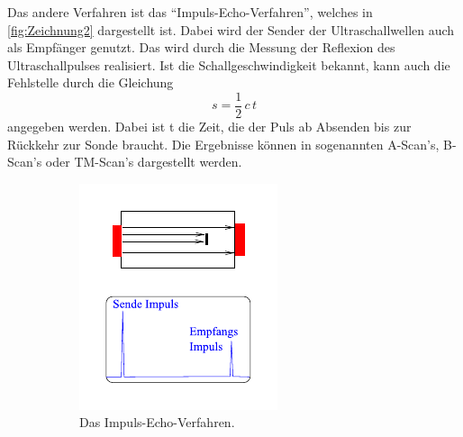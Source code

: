 Das andere Verfahren ist das \enquote{Impuls-Echo-Verfahren}, welches in \autoref{fig:Zeichnung2} dargestellt ist.
Dabei wird der Sender der Ultraschallwellen auch als Empfänger genutzt.
Das wird durch die Messung der Reflexion des Ultraschallpulses realisiert.
Ist die Schallgeschwindigkeit bekannt, kann auch die Fehlstelle durch die Gleichung
\begin{equation} \label{eq:s}
    s = \frac{1}{2} \, c \, t
\end{equation}
angegeben werden. Dabei ist t die Zeit, die der Puls ab Absenden bis zur Rückkehr zur Sonde braucht.
Die Ergebnisse können in sogenannten A-Scan's, B-Scan's oder TM-Scan's dargestellt werden.
\begin{figure}
    \centering
    \begin{subfigure}{0.49\columnwidth}
        \centering
        \includegraphics[width=\textwidth]{pictures/Zeichnung1.pdf}
        \caption{Das Impuls-Echo-Verfahren.}
        \label{fig:Zeichnung1}
    \end{subfigure}
    \hfill
    \begin{subfigure}{0.49\columnwidth}
        \centering

\end{subfigure}
\end{figure}
